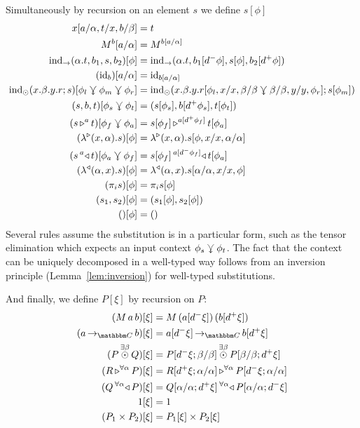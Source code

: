 \documentclass{llncs}
\begin{document}
\begin{definition}
  Simultaneously by recursion on an element $s$ we define $s[\phi]$
  \begin{align*}
    x[a/\alpha,t/x,b/\beta] &= t\\
    \pendappXtoY M b[a/\alpha] &= \pendappXtoY M {b[a/\alpha]}\\
    {\punitelimkontZatABC {\alpha. t}{b_1} s {b_2}}[\phi] &=
    {\punitelimkontZatABC {\alpha. t}{b_1[d^-\phi]} {s[\phi]} {b_2[d^+\phi]}}\\
    (\punitrefl b)[a/\alpha] &= \punitrefl {b[a/\alpha]}\\
    {\tensorelimWkontZ s {x.\beta.y.r}[\phi_l\jnctx\phi_m\jnctx\phi_r]} &=
    \tensorelimWkontZ {s[\phi_m]} {x.\beta.y. r[\phi_l,x/x,\beta/\beta \jnctx \beta/\beta,y/y,\phi_r]}\\
    {\tensorintroatXwithYandZ b s t}[\phi_s \jnctx \phi_t] &= \tensorintroatXwithYandZ {b[d^+\phi_s]} {s[\phi_s]} {t[\phi_t]}\\
    {(\homrappXtoYatZ s t a)}[\phi_f\jnctx \phi_a] &=
    {\homrappXtoYatZ {s[\phi_f]} {t[\phi_a]} {a[d^+\phi_f]}}\\
    {(\homrlambdaXatYdotZ {x}{\alpha} s)}[\phi] &=
    {\homrlambdaXatYdotZ {x}{\alpha} {s[\phi,x/x,\alpha/\alpha]}}\\
    {(\homlappXtoYatZ t s a)}[\phi_a\jnctx \phi_f] &=
    {\homlappXtoYatZ {t[\phi_a]} {s[\phi_f]} {a[d^-\phi_f]}}\\
    {(\homllambdaXatYdotZ {x}{\alpha} s)}[\phi] &=
    {\homllambdaXatYdotZ {x}{\alpha} {s[\alpha/\alpha,x/x,\phi]}}\\
    (\pi_i s)[\phi] &= \pi_i s[\phi]\\
    (s_1,s_2)[\phi] &= (s_1[\phi], s_2[\phi])\\
    ()[\phi] &= ()
  \end{align*}
  Several rules assume the substitution is in a particular form, such
  as the tensor elimination which expects an input context
  $\phi_s\jnctx\phi_t$. The fact that the context can be uniquely
  decomposed in a well-typed way follows from an inversion principle (Lemma~\ref{lem:inversion})
  for well-typed substitutions.

  And finally, we define $P[\xi]$ by recursion on $P$:
  \begin{align*}
    (M\,a\,b)[\xi] &= M\,(a[d^-\xi])\,(b[d^+\xi])\\
    (\punitinXfromYtoZ {\cat C} a b)[\xi] &= \punitinXfromYtoZ {\cat C} {a[d^- \xi]}{b[d^+ \xi]}\\
    (\tensorexistsXwithYandZ \beta P Q)[\xi] &= \tensorexistsXwithYandZ \beta {P[d^-\xi;\beta/\beta]}{P[\beta/\beta;d^+\xi]}\\
    (\homrallXYtoZ \alpha R P)[\xi] &= \homrallXYtoZ \alpha {R[d^+\xi;\alpha/\alpha]} {P[d^-\xi;\alpha/\alpha]}\\
    (\homlallXYtoZ \alpha P Q)[\xi] &= \homlallXYtoZ \alpha {P[\alpha/\alpha;d^-\xi]} {Q[\alpha/\alpha;d^+\xi]}\\
    1[\xi] &= 1\\
    (P_1 \times P_2)[\xi] &= P_1[\xi] \times P_2[\xi]
  \end{align*}
\end{definition}
\end{document}
